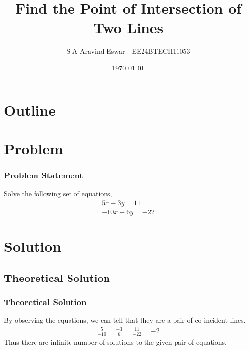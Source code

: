 \documentclass{beamer}
\title{Find the Point of Intersection of Two Lines}
\author{S A Aravind Eswar - EE24BTECH11053}
\date{\today}
\theoremstyle{remark}
\numberwithin{equation}{section}
\begin{document}
\begin{frame}
\titlepage
\end{frame}

\section*{Outline}
\begin{frame}
\tableofcontents
\end{frame}

\section{Problem}
\begin{frame}
\frametitle{Problem Statement}
    Solve the following set of equations,
    \begin{align}
        5x - 3y = 11\\
        -10x + 6y = -22
    \end{align}
\end{frame}

\section{Solution}

\subsection{Theoretical Solution}
\begin{frame}
    \frametitle{Theoretical Solution}
    By observing the equations, we can tell that they are a pair of co-incident lines.
    \begin{align}
        \frac{5}{-10} = \frac{-3}{6} = \frac{11}{-22} = -2
    \end{align}
    Thus there are infinite number of solutions to the given pair of equations.
\end{frame}
\end{document}
